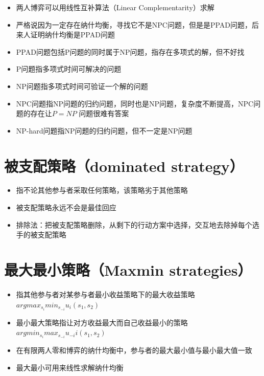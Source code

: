 \documentclass[]{book}
\providecommand{\tightlist}{%
  \setlength{\itemsep}{0pt}\setlength{\parskip}{0pt}}
\begin{document}
\begin{itemize}
\tightlist
\item
  两人博弈可以用线性互补算法（Linear Complementarity）求解
\item
  严格说因为一定存在纳什均衡，寻找它不是NPC问题，但是是PPAD问题，后来人证明纳什均衡是PPAD问题
\item
  PPAD问题包括P问题的同时属于NP问题，指存在多项式的解，但不好找
\item
  P问题指多项式时间可解决的问题
\item
  NP问题指多项式时间可验证一个解的问题
\item
  NPC问题指NP问题的归约问题，同时也是NP问题，复杂度不断提高，NPC问题的存在让\(P = NP\) 问题很难有答案
\item
  NP-hard问题指NP问题的归约问题，但不一定是NP问题
\end{itemize}

\hypertarget{dominated-strategy}{%
\section{被支配策略（dominated strategy）}\label{dominated-strategy}}

\begin{itemize}
\tightlist
\item
  指不论其他参与者采取任何策略，该策略劣于其他策略
\item
  被支配策略永远不会是最佳回应
\item
  排除法：把被支配策略删除，从剩下的行动方案中选择，交互地去除掉每个选手的被支配策略
\end{itemize}

\hypertarget{maxmin-strategies}{%
\section{最大最小策略（Maxmin strategies）}\label{maxmin-strategies}}

\begin{itemize}
\tightlist
\item
  指其他参与者对某参与者最小收益策略下的最大收益策略\(arg max_{s_i}min_{s_{-i}}u_i(s_1,s_2)\)
\item
  最小最大策略指让对方收益最大而自己收益最小的策略\(arg min_{s_i}max_{s_{-i}}u_{-i}i(s_1,s_2)\)
\item
  在有限两人零和博弈的纳什均衡中，参与者的最大最小值与最小最大值一致
\item
  最大最小可用来线性求解纳什均衡
\end{itemize}
\end{document}
